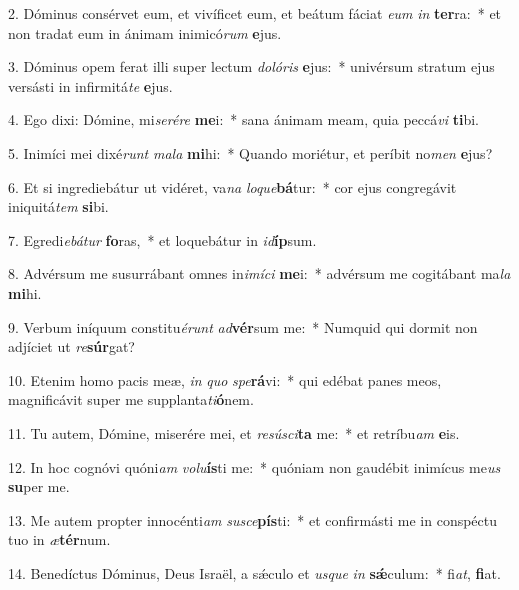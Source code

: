 2. Dóminus consérvet eum, et vivíficet eum, et beátum fáciat \textit{e}\textit{um} \textit{in} \textbf{ter}ra:~*  et non tradat eum in ánimam inimicó\textit{rum} \textbf{e}jus.\

3. Dóminus opem ferat illi super lectum \textit{do}\textit{ló}\textit{ris} \textbf{e}jus:~*  univérsum stratum ejus versásti in infirmitá\textit{te} \textbf{e}jus.\

4. Ego dixi: Dómine, mi\textit{se}\textit{ré}\textit{re} \textbf{me}i:~*  sana ánimam meam, quia peccá\textit{vi} \textbf{ti}bi.\

5. Inimíci mei dixé\textit{runt} \textit{ma}\textit{la} \textbf{mi}hi:~*  Quando moriétur, et períbit no\textit{men} \textbf{e}jus?\

6. Et si ingrediebátur ut vidéret, va\textit{na} \textit{lo}\textit{que}\textbf{bá}tur:~*  cor ejus congregávit iniquitá\textit{tem} \textbf{si}bi.\

7. Egredi\textit{e}\textit{bá}\textit{tur} \textbf{fo}ras,~*  et loquebátur in \textit{id}\textbf{íp}sum.\

8. Advérsum me susurrábant omnes in\textit{i}\textit{mí}\textit{ci} \textbf{me}i:~*  advérsum me cogitábant ma\textit{la} \textbf{mi}hi.\

9. Verbum iníquum constitu\textit{é}\textit{runt} \textit{ad}\textbf{vér}sum me:~*  Numquid qui dormit non adjíciet ut \textit{re}\textbf{súr}gat?\

10. Etenim homo pacis meæ, \textit{in} \textit{quo} \textit{spe}\textbf{rá}vi:~*  qui edébat panes meos, magnificávit super me supplanta\textit{ti}\textbf{ó}nem.\

11. Tu autem, Dómine, miserére mei, et \textit{re}\textit{sú}\textit{sci}\textbf{ta} me:~*  et retríbu\textit{am} \textbf{e}is.\

12. In hoc cognóvi quóni\textit{am} \textit{vo}\textit{lu}\textbf{ís}ti me:~*  quóniam non gaudébit inimícus me\textit{us} \textbf{su}per me.\

13. Me autem propter innocénti\textit{am} \textit{su}\textit{sce}\textbf{pís}ti:~*  et confirmásti me in conspéctu tuo in \textit{æ}\textbf{tér}num.\

14. Benedíctus Dóminus, Deus Israël, a sǽculo et \textit{us}\textit{que} \textit{in} \textbf{sǽ}culum:~*  fi\textit{at}, \textbf{fi}at.\

